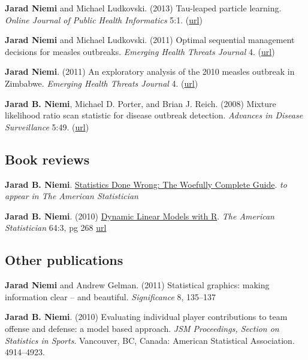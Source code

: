 \documentclass[overlapped,line]{res}
\newcommand{\sinceappt}{}
\begin{document}
\begin{resume}
{\bf Jarad Niemi} and Michael Ludkovski. (2013) Tau-leaped particle learning. \emph{Online Journal of Public Health Informatics} 5:1. (\href{http://dx.doi.org/10.5210%2Fojphi.v5i1.4575}{url})

\sinceappt

{\bf Jarad Niemi} and Michael Ludkovski. (2011) Optimal sequential management decisions for measles outbreaks. \emph{Emerging Health Threats Journal} 4. (\href{http://dx.doi.org/10.3402/ehtj.v4i0.11907}{url})

{\bf Jarad Niemi}. (2011) An exploratory analysis of the 2010 measles outbreak in Zimbabwe. \emph{Emerging Health Threats Journal} 4. (\href{http://dx.doi.org/10.3402/ehtj.v4i0.11907}{url})

{\bf Jarad B. Niemi}, Michael D. Porter, and Brian J. Reich. (2008) Mixture likelihood ratio scan statistic for disease outbreak detection. \emph{Advances in Disease Surveillance} 5:49. (\href{http://faculty.washington.edu/lober/www.isdsjournal.org/htdocs/articles/3251.pdf}{url})



\subsection{\bf Book reviews} \vspace{-0.2in}

{\bf Jarad B. Niemi}. \underline{Statistics Done Wrong: The Woefully Complete Guide}. \emph{to appear in The American Statistician} 

\sinceappt

{\bf Jarad B. Niemi}. (2010) \underline{Dynamic Linear Models with R}. \emph{The American Statistician} 64:3, pg 268 \href{http://dx.doi.org/10.1198/tast.2010.br643}{url}



\subsection{\bf Other publications} \vspace{-0.2in}

{\bf Jarad Niemi} and Andrew Gelman. (2011) Statistical graphics: making information clear -- and beautiful. \emph{Significance} 8, 135--137

\sinceappt

{\bf Jarad B. Niemi}. (2010) Evaluating individual player contributions to team offense and defense: a model based approach. \emph{JSM Proceedings, Section on Statistics in Sports}. Vancouver, BC, Canada: American Statistical Association. 4914--4923.


\end{resume}
\end{document}
